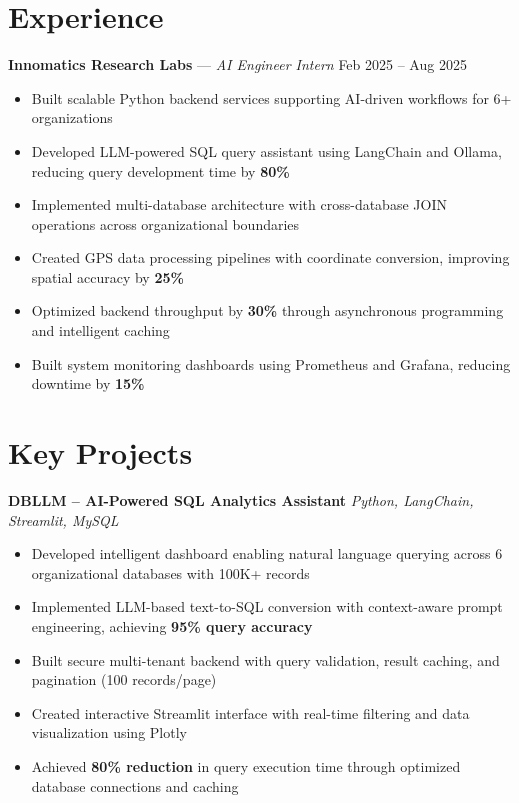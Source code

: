 \documentclass[letterpaper,10.5pt]{article}
\begin{document}
\section{Experience}
\textbf{Innomatics Research Labs} — \textit{AI Engineer Intern} \hfill Feb 2025 – Aug 2025
\begin{itemize}
\item Built scalable Python backend services supporting AI-driven workflows for 6+ organizations
\item Developed LLM-powered SQL query assistant using LangChain and Ollama, reducing query development time by \textbf{80\%}
\item Implemented multi-database architecture with cross-database JOIN operations across organizational boundaries
\item Created GPS data processing pipelines with coordinate conversion, improving spatial accuracy by \textbf{25\%}
\item Optimized backend throughput by \textbf{30\%} through asynchronous programming and intelligent caching
\item Built system monitoring dashboards using Prometheus and Grafana, reducing downtime by \textbf{15\%}
\end{itemize}

\section{Key Projects}

\textbf{DBLLM – AI-Powered SQL Analytics Assistant} \hfill \textit{Python, LangChain, Streamlit, MySQL}
\begin{itemize}
\item Developed intelligent dashboard enabling natural language querying across 6 organizational databases with 100K+ records
\item Implemented LLM-based text-to-SQL conversion with context-aware prompt engineering, achieving \textbf{95\% query accuracy}
\item Built secure multi-tenant backend with query validation, result caching, and pagination (100 records/page)
\item Created interactive Streamlit interface with real-time filtering and data visualization using Plotly
\item Achieved \textbf{80\% reduction} in query execution time through optimized database connections and caching
\end{itemize}
\end{document}
